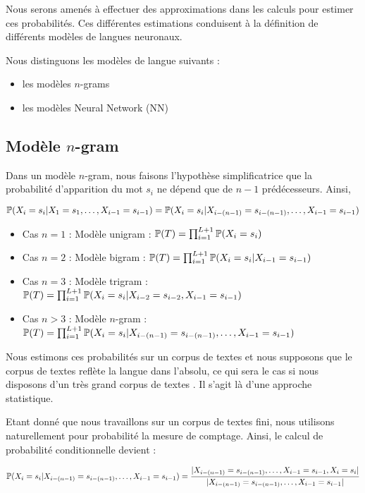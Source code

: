 Nous serons amenés à effectuer des approximations dans les calculs pour estimer ces probabilités. Ces différentes estimations conduisent à la définition de différents modèles de langues neuronaux.

Nous distinguons les modèles de langue suivants :

\begin{itemize}
  \item les modèles $n$-grams
  \item les modèles Neural Network (NN)
\end{itemize}

\subsection{Modèle $n$-gram}
Dans un modèle $n$-gram, nous faisons l'hypothèse simplificatrice que la probabilité d'apparition du mot $s_i$ ne dépend que de $n-1$ prédécesseurs. Ainsi,

\[ \P(X_i=s_i \vert X_1=s_1,\ldots, X_{i-1}=s_{i-1}) = \P(X_i=s_i \vert X_{i-(n-1)}=s_{i-(n-1)},\ldots, X_{i-1}=s_{i-1}) \]

\vspace{0.4cm}

\begin{itemize}
  \item Cas $n=1$ : Modèle unigram : $\P(T) = \prod_{i=1}^{L+1} \P(X_i = s_i)$
  \item Cas $n=2$ : Modèle bigram : $\P(T) = \prod_{i=1}^{L+1} \P(X_i = s_i\vert X_{i-1} = s_{i-1})$
  \item Cas $n=3$ : Modèle trigram : $\P(T) = \prod_{i=1}^{L+1} \P(X_i = s_i\vert X_{i-2} = s_{i-2}, X_{i-1} = s_{i-1})$
  \item Cas $n > 3$ : Modèle $n$-gram : $\P(T) = \prod_{i=1}^{L+1} \P(X_i = s_i\vert X_{i-(n-1)} = s_{i-(n-1)}, \ldots, X_{i-1} = s_{i-1})$
\end{itemize}

Nous estimons ces probabilités sur un corpus de textes et nous supposons que le corpus de textes reflète la langue dans l'absolu, 
ce qui sera le cas si nous disposons d'un très grand corpus de textes . Il s'agit là d'une approche statistique.

Etant donné que nous travaillons sur un corpus de textes fini, nous utilisons naturellement pour probabilité la mesure de comptage. Ainsi, le calcul de probabilité conditionnelle devient :

\[ \P(X_i = s_i\vert X_{i-(n-1)} = s_{i-(n-1)}, \ldots, X_{i-1} = s_{i-1}) = \frac{\vert X_{i-(n-1)} = s_{i-(n-1)}, \ldots, X_{i-1} = s_{i-1}, X_i = s_i\vert}{\vert X_{i-(n-1)} = s_{i-(n-1)},\ldots, X_{i-1} = s_{i-1}\vert} \]

